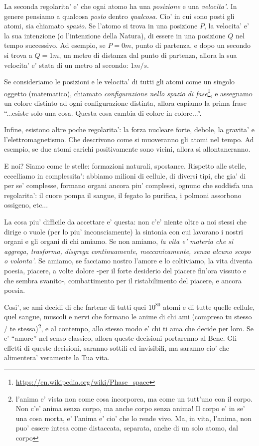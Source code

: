 La seconda regolarita' e' che ogni atomo ha una \emph{posizione} e una \emph{velocita'}. In genere pensiamo a qualcosa \emph{posto} dentro \emph{qualcosa}. Cio' in cui sono posti gli atomi, sia chiamato \emph{spazio}. Se l'atomo si trova in una posizione $P$, la velocita' e' la sua intenzione (o l'intenzione della Natura), di essere in una posizione $Q$ nel tempo successivo. Ad esempio, se $P=0m$, punto di partenza, e dopo un secondo si trova a $Q=1m$, un metro di distanza dal punto di partenza, allora la sua velocita' e' stata di un metro al secondo: $1 m/s$.

Se consideriamo le posizioni e le velocita' di tutti gli atomi come un singolo oggetto (matematico), chiamato \emph{configurazione nello spazio di fase}\footnote{\url{https://en.wikipedia.org/wiki/Phase\_space}}, e assegnamo un colore distinto ad ogni configurazione distinta, allora capiamo la prima frase ``...esiste solo una cosa. Questa cosa cambia di colore in colore...''.

Infine, esistono altre poche regolarita': la forza nucleare forte, debole, la gravita' e l'elettromagnetismo. Che descrivono come si muoveranno gli atomi nel tempo. Ad esempio, se due atomi carichi positivamente sono vicini, allora si allontaneranno.

E noi? Siamo come le stelle: formazioni naturali, spostanee. Rispetto alle stelle, eccelliamo in complessita': abbiamo milioni di cellule, di diversi tipi, che gia' di per se' complesse, formano organi ancora piu' complessi, ognuno che soddisfa una regolarita': il cuore pompa il sangue, il fegato lo purifica, i polmoni assorbono ossigeno, etc...

La cosa piu' difficile da accettare e' questa: non c'e' niente oltre a noi stessi che dirige o vuole (per lo piu' inconsciamente) la sintonia con cui lavorano i nostri organi e gli organi di chi amiamo. Se non amiamo, \emph{la vita e' materia che si aggrega, trasforma, disgrega continuamente, meccanicamente, senza alcuno scopo o volonta'}. Se amiamo, se facciamo nostro l'amore e lo coltiviamo, la vita diventa poesia, piacere, a volte dolore -per il forte desiderio del piacere fin'ora vissuto e che sembra svanito-, combattimento per il ristabilimento del piacere, e ancora poesia. 

Cosi', se ami decidi di che fartene di tutti quei $10^{80}$ atomi e di tutte quelle cellule, quel sangue, muscoli e nervi che formano le anime di chi ami (compreso tu stesso / te stessa)\footnote{l'anima e' vista non come cosa incorporea, ma come un tutt'uno con il corpo. Non c'e' anima senza corpo, ma anche corpo senza anima! Il corpo e' in se' una cosa morta, e' l'anima e' cio' che lo rende vivo. Ma, in vita, l'anima, non puo' essere intesa come distaccata, separata, anche di un solo atomo, dal corpo}, e al contempo, allo stesso modo e' chi ti ama che decide per loro. Se e' ``amore'' nel senso classico, allora queste decisioni portarenno al Bene. Gli effetti di queste decisioni, saranno sottili ed invisibili, ma saranno cio' che alimentera' veramente la Tua vita.

